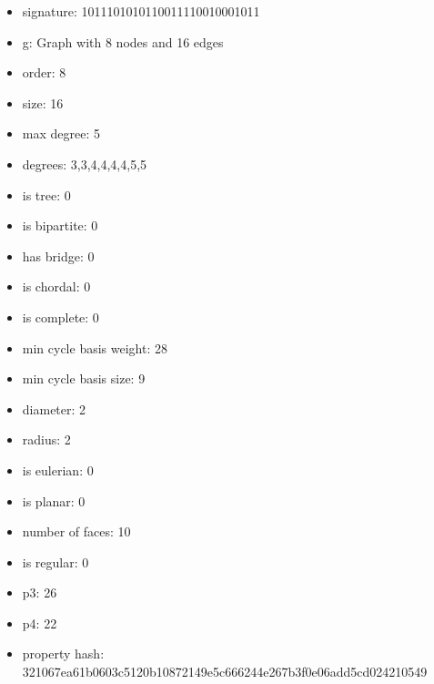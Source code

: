 \begin{itemize}
\item signature: 1011101010110011110010001011
\item g: Graph with 8 nodes and 16 edges
\item order: 8
\item size: 16
\item max degree: 5
\item degrees: 3,3,4,4,4,4,5,5
\item is tree: 0
\item is bipartite: 0
\item has bridge: 0
\item is chordal: 0
\item is complete: 0
\item min cycle basis weight: 28
\item min cycle basis size: 9
\item diameter: 2
\item radius: 2
\item is eulerian: 0
\item is planar: 0
\item number of faces: 10
\item is regular: 0
\item p3: 26
\item p4: 22
\item property hash: 321067ea61b0603c5120b10872149e5c666244e267b3f0e06add5cd024210549
\end{itemize}
\newpage
\begin{figure}
\end{figure}
